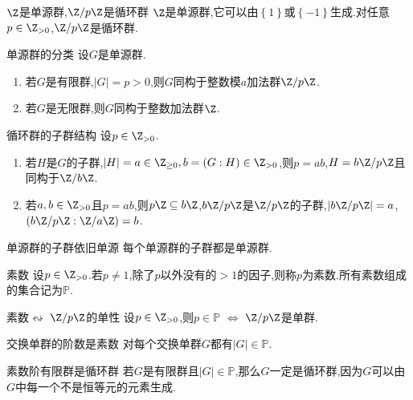 \begin{example}{$\Z$是单源群,$\Z/p\Z$是循环群}{}
	$\Z$是单源群,它可以由$\left\{1\right\}$或$\left\{-1\right\}$生成.对任意$p\in\Z_{>0}$,$\Z/p\Z$是循环群.
\end{example}

\begin{proposition}{单源群的分类}{}
	设$G$是单源群.
	\begin{enumerate}
		\item 若$G$是有限群,$\left|G\right|=p>0$,则$G$同构于整数模$a$加法群$\Z/p\Z$.
		\item 若$G$是无限群,则$G$同构于整数加法群$\Z$.
	\end{enumerate}
\end{proposition}

\begin{proposition}{循环群的子群结构}{}
	设$p\in\Z_{>0}$.
	\begin{enumerate}
		\item 若$H$是$G$的子群,$\left|H\right|=a\in\Z_{\geq 0},b=\left(G:H\right)\in\Z_{>0}$,则$p=ab$,$H=b\Z/p\Z$且同构于$\Z/b\Z$.
		\item 若$a,b\in\Z_{>0}$且$p=ab$,则$p\Z\subseteq b\Z$,$b\Z/p\Z$是$\Z/p\Z$的子群,$\left|b\Z/p\Z\right|=a$,$\left(b\Z/p\Z:\Z/a\Z\right)=b$.
	\end{enumerate}
\end{proposition}

\begin{corollary}{单源群的子群依旧单源}{}
	每个单源群的子群都是单源群.
\end{corollary}

\begin{definition}{素数}{}
	设$p\in\Z_{>0}$.若$p\neq 1$,除了$p$以外没有的$>1$的因子,则称$p$为素数.所有素数组成的集合记为$\mathbb{P}$.
\end{definition}

\begin{proposition}{素数$\leftrightsquigarrow$ $\Z/p\Z$的单性}{}
	设$p\in\Z_{>0}$,则$p\in\mathbb{P}$ $\iff$ $\Z/p\Z$是单群.
\end{proposition}

\begin{proposition}{交换单群的阶数是素数}{}
	对每个交换单群$G$都有$\left|G\right|\in\mathbb{P}$.
\end{proposition}

\begin{remark}{素数阶有限群是循环群}{}
	若$G$是有限群且$\left|G\right|\in\mathbb{P}$,那么$G$一定是循环群,因为$G$可以由$G$中每一个不是恒等元的元素生成.
\end{remark}

